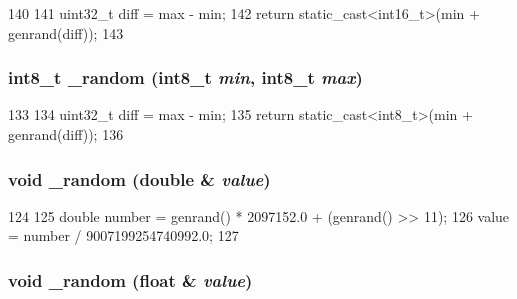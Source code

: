 \begin{DoxyCode}
140     {
141         uint32_t diff = max - min;
142         return static_cast<int16_t>(min + genrand(diff));
143     }
\end{DoxyCode}
\hypertarget{classRandom_ab0f436dd0b2823deb7a5a52c8b41d6f8}{
\subsubsection[{\_\-random}]{\setlength{\rightskip}{0pt plus 5cm}int8\_\-t \_\-random (int8\_\-t {\em min}, \/  int8\_\-t {\em max})}}
\label{classRandom_ab0f436dd0b2823deb7a5a52c8b41d6f8}



\begin{DoxyCode}
133     {
134         uint32_t diff = max - min;
135         return static_cast<int8_t>(min + genrand(diff));
136     }
\end{DoxyCode}
\hypertarget{classRandom_a220f0a1b909e4a2c624693f0310656bc}{
\subsubsection[{\_\-random}]{\setlength{\rightskip}{0pt plus 5cm}void \_\-random (double \& {\em value})}}
\label{classRandom_a220f0a1b909e4a2c624693f0310656bc}



\begin{DoxyCode}
124     {
125         double number = genrand() * 2097152.0 + (genrand() >> 11);
126         value = number / 9007199254740992.0;
127     }
\end{DoxyCode}
\hypertarget{classRandom_a96ad5752733f5bc0769c8910378958a8}{
\subsubsection[{\_\-random}]{\setlength{\rightskip}{0pt plus 5cm}void \_\-random (float \& {\em value})}}
\label{classRandom_a96ad5752733f5bc0769c8910378958a8}



